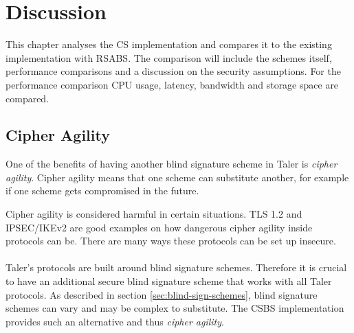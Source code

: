 \chapter{Discussion}
\label{chap:disc}
This chapter analyses the \acl{CS} implementation and compares it to the existing implementation with \gls{RSABS}.
The comparison will include the schemes itself, performance comparisons and a discussion on the security assumptions.
For the performance comparison CPU usage, latency, bandwidth and storage space are compared.

\section{Cipher Agility}
One of the benefits of having another blind signature scheme in Taler is \textit{cipher agility}.
Cipher agility means that one scheme can substitute another, for example if one scheme gets compromised in the future.

Cipher agility is considered harmful in certain situations.
TLS 1.2 \cite{rfc5246} and IPSEC/IKEv2 \cite{rfc6071} are good examples on how dangerous cipher agility inside protocols can be.
There are many ways these protocols can be set up insecure.
\\\\
Taler's protocols are built around blind signature schemes.
Therefore it is crucial to have an additional secure blind signature scheme that works with all Taler protocols.
As described in section \ref{sec:blind-sign-schemes}, blind signature schemes can vary and may be complex to substitute.
The \gls{CSBS} implementation provides such an alternative and thus \textit{cipher agility}.

